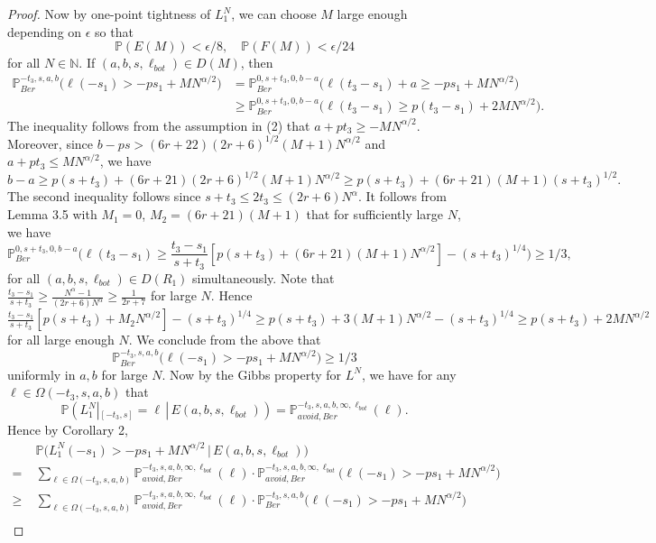 \documentclass[12pt]{article}
\begin{document}
\begin{proof}
		Now by one-point tightness of $L_1^N$, we can choose $M$ large enough depending on $\epsilon$ so that
		\[
		\mathbb{P}(E(M)) < \epsilon/8, \quad \mathbb{P}(F(M)) < \epsilon/24
		\]
		for all $N\in\mathbb{N}$. If $(a,b,s,\ell_{bot})\in D(M)$, then
		\begin{align*}
		\mathbb{P}^{-t_3,s,a,b}_{Ber}\Big( \ell(-s_1) > -ps_1 + MN^{\alpha/2}\Big) &= \mathbb{P}^{0,s+t_3,0,b-a}_{Ber}\Big(\ell(t_3-s_1) + a \geq -ps_1 + MN^{\alpha/2}\Big)\\
		&\geq \mathbb{P}^{0,s+t_3,0,b-a}_{Ber}\Big(\ell(t_3-s_1) \geq p(t_3-s_1) + 2MN^{\alpha/2}\Big).
		\end{align*}
		The inequality follows from the assumption in (2) that $a+pt_3 \geq -MN^{\alpha/2}$. Moreover, since $b-ps > (6r+22)(2r+6)^{1/2}(M+1)N^{\alpha/2}$ and $a+pt_3 \leq MN^{\alpha/2}$, we have 
		\[
		b-a \geq p(s+t_3) + (6r+21)(2r+6)^{1/2}(M+1)N^{\alpha/2} \geq p(s+t_3) + (6r+21)(M+1)(s+t_3)^{1/2}.
		\]  
		 The second inequality follows since $s+t_3 \leq 2t_3 \leq (2r+6)N^{\alpha}$. It follows from Lemma 3.5 with $M_1 = 0$, $M_2 = (6r+21)(M+1)$ that for sufficiently large $N$, we have
		\[
		 \mathbb{P}^{0,s+t_3,0,b-a}_{Ber}\Big(\ell(t_3-s_1) \geq \frac{t_3 - s_1}{s+t_3}[p(s+t_3) + (6r+21)(M+1) N^{\alpha/2}] - (s+t_3)^{1/4}\Big) \geq 1/3,
		\]
		for all $(a,b,s,\ell_{bot}) \in D(R_1)$ simultaneously. Note that $\frac{t_3-s_1}{s+t_3} \geq \frac{N^\alpha - 1}{(2r+6)N^\alpha} \geq \frac{1}{2r+7}$
		for large $N$. Hence $\frac{t_3 - s_1}{s+t_3}[p(s+t_3) + M_2 N^{\alpha/2}] - (s+t_3)^{1/4} \geq p(s+t_3) + 3(M+1)N^{\alpha/2} - (s+t_3)^{1/4}\geq p(s+t_3) + 2MN^{\alpha/2}$ for all large enough $N$. We conclude from the above that
		\[
		\mathbb{P}^{-t_3,s,a,b}_{Ber}\Big(\ell(-s_1) > -ps_1 + MN^{\alpha/2}\Big) \geq 1/3
		\]
		uniformly in $a,b$ for large $N$. Now by the Gibbs property for $L^N$, we have for any $\ell\in\Omega(-t_3,s,a,b)$ that
		\[
		\mathbb{P}(L_1^N|_{[-t_3,s]} = \ell\,|\,E(a,b,s,\ell_{bot})) = \mathbb{P}^{-t_3,s,a,b,\infty,\ell_{bot}}_{avoid, Ber}(\ell).
		\]
		Hence by Corollary 2,
		\begin{align*}
		&\mathbb{P}\big( L_1^N(-s_1) > -ps_1 + MN^{\alpha/2}\,\big|\,E(a,b,s,\ell_{bot})\big)\\
		= \; & \sum_{\ell\in\Omega(-t_3,s,a,b)} \mathbb{P}^{-t_3,s,a,b,\infty,\ell_{bot}}_{avoid, Ber}(\ell)\cdot \mathbb{P}^{-t_3,s,a,b,\infty,\ell_{bot}}_{avoid, Ber}\big(\ell(-s_1) > -ps_1 + MN^{\alpha/2}\big)\\
		\geq \; & \sum_{\ell\in\Omega(-t_3,s,a,b)} \mathbb{P}^{-t_3,s,a,b,\infty,\ell_{bot}}_{avoid, Ber}(\ell)\cdot \mathbb{P}^{-t_3,s,a,b}_{Ber}\big(\ell(-s_1) > -ps_1 + MN^{\alpha/2}\big)\\

\end{align*}
\end{proof}
\end{document}
